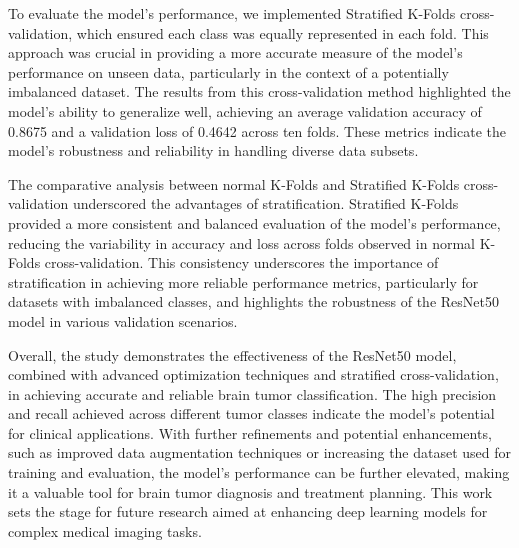 To evaluate the model's performance, we implemented Stratified K-Folds cross-validation, which ensured each class was equally represented in each fold. This approach was crucial in providing a more accurate measure of the model's performance on unseen data, particularly in the context of a potentially imbalanced dataset. The results from this cross-validation method highlighted the model's ability to generalize well, achieving an average validation accuracy of 0.8675 and a validation loss of 0.4642 across ten folds. These metrics indicate the model's robustness and reliability in handling diverse data subsets.

The comparative analysis between normal K-Folds and Stratified K-Folds cross-validation underscored the advantages of stratification. Stratified K-Folds provided a more consistent and balanced evaluation of the model's performance, reducing the variability in accuracy and loss across folds observed in normal K-Folds cross-validation. This consistency underscores the importance of stratification in achieving more reliable performance metrics, particularly for datasets with imbalanced classes, and highlights the robustness of the ResNet50 model in various validation scenarios.

Overall, the study demonstrates the effectiveness of the ResNet50 model, combined with advanced optimization techniques and stratified cross-validation, in achieving accurate and reliable brain tumor classification. The high precision and recall achieved across different tumor classes indicate the model's potential for clinical applications. With further refinements and potential enhancements, such as improved data augmentation techniques or increasing the dataset used for training and evaluation, the model's performance can be further elevated, making it a valuable tool for brain tumor diagnosis and treatment planning. This work sets the stage for future research aimed at enhancing deep learning models for complex medical imaging tasks.